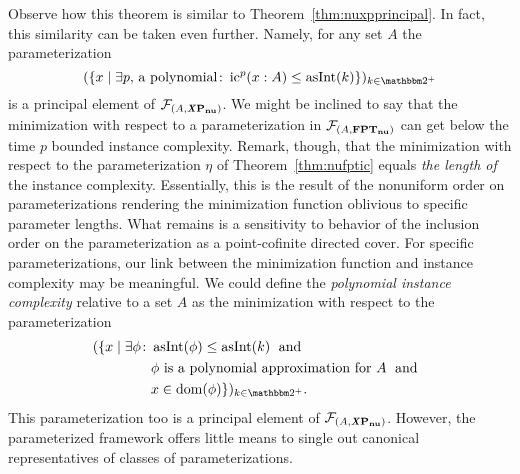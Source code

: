 Observe how this theorem is similar to Theorem~\ref{thm:nuxpprincipal}.
In fact, this similarity can be taken even further.
Namely, for any set $A$ the parameterization
\begin{equation*}
  (\{x \st \exists p\text{, a polynomial}\colon \ic^p(x : A) \le \asNat(k)\})_{k \in \binary^+}
\end{equation*}
is a principal element of $\mathcal{F}_{(A, \textnormal{\textbf{\textit{X}P$_\textbf{nu}$}})}$.
We might be inclined to say that the minimization with respect to a parameterization in $\mathcal{F}_{(A, \textnormal{\textbf{FPT$_\textbf{nu}$}})}$ can get below the time $p$ bounded instance complexity.
Remark, though, that the minimization with respect to the parameterization $\eta$ of Theorem~\ref{thm:nufptic} equals \emph{the length of} the instance complexity.
Essentially, this is the result of the nonuniform order on parameterizations rendering the minimization function oblivious to specific parameter lengths.
What remains is a sensitivity to behavior of the inclusion order on the parameterization as a point-cofinite directed cover.
For specific parameterizations, our link between the minimization function and instance complexity may be meaningful.
We could define the \emph{polynomial instance complexity} relative to a set $A$ as the minimization with respect to the parameterization
\begin{align*}
  (\{x \st \exists \phi\colon &\asNat(\phi) \le \asNat(k) \reland \\
  	&\text{$\phi$ is a polynomial approximation for $A$} \reland \\
  	&x \in \dom(\phi)\})_{k \in \binary^+}.
\end{align*}
This parameterization too is a principal element of $\mathcal{F}_{(A, \textnormal{\textbf{\textit{X}P$_\textbf{nu}$}})}$.
However, the parameterized framework offers little means to single out canonical representatives of classes of parameterizations.

